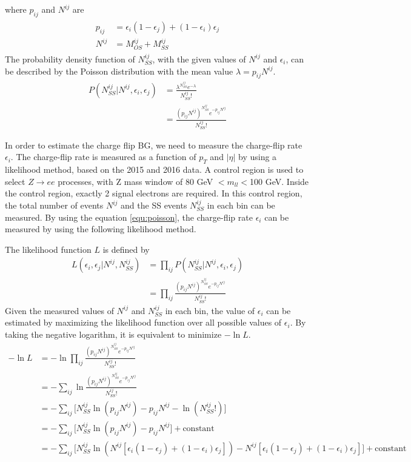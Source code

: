 where $p_{ij}$ and $N^{ij}$ are
\begin{align}
\begin{split}
p_{ij} &= \epsilon_i (1-\epsilon_j) + (1-\epsilon_i) \epsilon_j \\
N^{ij} &= M^{ij}_{OS} + M^{ij}_{SS}
\end{split}
\end{align}
The probability density function of $N^{ij}_{SS}$, with the given values of $N^{ij}$ and $\epsilon_i$, can be described by the Poisson distribution with the mean value $\lambda = p_{ij} N^{ij}$.
\begin{align}
P(N^{ij}_{SS}|N^{ij},\epsilon_i,\epsilon_j) &= \frac{ \lambda^{N^{ij}_{SS}} e^{-\lambda} }{N^{ij}_{SS}!} \\
 &= \frac{ (p_{ij} N^{ij})^{N^{ij}_{SS}} e^{- p_{ij} N^{ij}} }{N^{ij}_{SS}!}
\label{equ:poisson}
\end{align}

In order to estimate the charge flip BG, we need to measure the charge-flip rate $\epsilon_i$.
The charge-flip rate is measured as a function of $p_T$ and $|\eta|$ by using a likelihood method, based on the 2015 and 2016 data.
A control region is used to select $Z \rightarrow ee$ processes, with Z mass window of 80 GeV $<m_{ll}<$100 GeV.
Inside the control region, exactly 2 signal electrons are required.
In this control region, the total number of events $N^{ij}$ and the SS events $N^{ij}_{SS}$ in each bin can be measured.
By using the equation \ref{equ:poisson}, the charge-flip rate $\epsilon_i$ can be measured by using the following likelihood method.

The likelihood function $L$ is defined by
\begin{align}
L(\epsilon_i,\epsilon_j|N^{ij},N^{ij}_{SS}) &= \prod_{ij} P(N^{ij}_{SS}|N^{ij},\epsilon_i,\epsilon_j) \\
&= \prod_{ij} \frac{ (p_{ij} N^{ij})^{N^{ij}_{SS}} e^{- p_{ij} N^{ij}} }{N^{ij}_{SS}!}
\end{align}
Given the measured values of $N^{ij}$ and $N^{ij}_{SS}$ in each bin, the value of $\epsilon_i$ can be estimated by maximizing the likelihood function over all possible values of $\epsilon_i$.
By taking the negative logarithm, it is equivalent to minimize $- \ln L$.
\begin{align}
- \ln L
&= - \ln \prod_{ij} \frac{ (p_{ij} N^{ij})^{N^{ij}_{SS}} e^{- p_{ij} N^{ij}} }{N^{ij}_{SS}!} \\
&= - \sum_{ij} \ln \frac{ (p_{ij} N^{ij})^{N^{ij}_{SS}} e^{- p_{ij} N^{ij}} }{N^{ij}_{SS}!} \\
&= - \sum_{ij} \Big[ N^{ij}_{SS} \ln (p_{ij} N^{ij}) - p_{ij} N^{ij} - \ln( N^{ij}_{SS}!) \Big] \\
&= - \sum_{ij} \Big[ N^{ij}_{SS} \ln (p_{ij} N^{ij}) - p_{ij} N^{ij} \Big] + \text{constant} \\
&= - \sum_{ij} \Big[ N^{ij}_{SS} \ln (N^{ij}[\epsilon_i (1-\epsilon_j) + (1-\epsilon_i) \epsilon_j]) - N^{ij}[\epsilon_i (1-\epsilon_j) + (1-\epsilon_i) \epsilon_j] \Big] + \text{constant}
\end{align}

